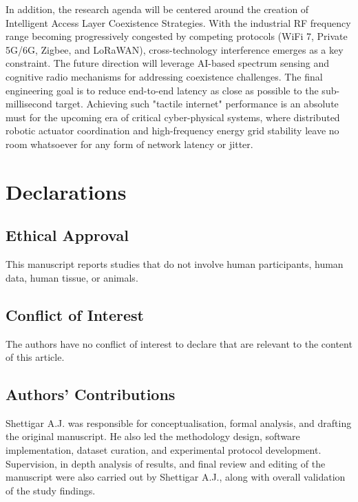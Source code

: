 \documentclass[a4paper,fleqn]{cas-dc}
\numberwithin{equation}{section}
\begin{document}
In addition, the research agenda will be centered around the creation of Intelligent Access Layer Coexistence Strategies. With the industrial RF frequency range becoming progressively congested by competing protocols (WiFi 7, Private 5G/6G, Zigbee, and LoRaWAN), cross-technology interference emerges as a key constraint. The future direction will leverage AI-based spectrum sensing and cognitive radio mechanisms for addressing coexistence challenges. The final engineering goal is to reduce end-to-end latency as close as possible to the sub-millisecond target. Achieving such "tactile internet" performance is an absolute must for the upcoming era of critical cyber-physical systems, where distributed robotic actuator coordination and high-frequency energy grid stability leave no room whatsoever for any form of network latency or jitter.

\section{Declarations}
 
\subsection{Ethical Approval}
This manuscript reports studies that do not involve human participants, human data, human tissue, or animals.

\subsection{Conflict of Interest}
The authors have no conflict of interest to declare that are relevant to the content of this article.

\subsection{Authors' Contributions}
Shettigar A.J. was responsible for conceptualisation, formal analysis, and drafting the original manuscript. He also led the methodology design, software implementation, dataset curation, and experimental protocol development. Supervision, in depth analysis of results, and final review and editing of the manuscript were also carried out by Shettigar A.J., along with overall validation of the study findings.



\end{document}
